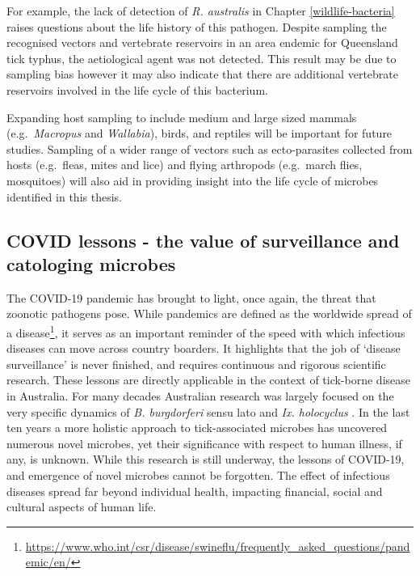 \documentclass[a4paper, nobind]{templates/ociamthesis}
\begin{document}
For example, the lack of detection of \emph{R. australis} in Chapter \ref{wildlife-bacteria} raises questions about the life history of this pathogen.
Despite sampling the recognised vectors and vertebrate reservoirs \autocite{campbellRickettsiosesAustraliaIsolation1974,sextonSpottedFeverGroup1991} in an area endemic for Queensland tick typhus, the aetiological agent was not detected.
This result may be due to sampling bias however it may also indicate that there are additional vertebrate reservoirs involved in the life cycle of this bacterium.

Expanding host sampling to include medium and large sized mammals (e.g.~\emph{Macropus} and \emph{Wallabia}), birds, and reptiles will be important for future studies.
Sampling of a wider range of vectors such as ecto-parasites collected from hosts (e.g.~fleas, mites and lice) and flying arthropods (e.g.~march flies, mosquitoes) will also aid in providing insight into the life cycle of microbes identified in this thesis.

\hypertarget{covid-lessons---the-value-of-surveillance-and-catologing-microbes}{%
\subsection{COVID lessons - the value of surveillance and catologing microbes}\label{covid-lessons---the-value-of-surveillance-and-catologing-microbes}}

The COVID-19 pandemic has brought to light, once again, the threat that zoonotic pathogens pose.
While pandemics are defined as the worldwide spread of a disease\footnote{\url{https://www.who.int/csr/disease/swineflu/frequently_asked_questions/pandemic/en/}}, it serves as an important reminder of the speed with which infectious diseases can move across country boarders.
It highlights that the job of `disease surveillance' is never finished, and requires continuous and rigorous scientific research.
These lessons are directly applicable in the context of tick-borne disease in Australia.
For many decades Australian research was largely focused on the very specific dynamics of \emph{B. burgdorferi} sensu lato and \emph{Ix. holocyclus} \autocite{chaladaThereLymelikeDisease2016}.
In the last ten years a more holistic approach to tick-associated microbes has uncovered numerous novel microbes, yet their significance with respect to human illness, if any, is unknown.
While this research is still underway, the lessons of COVID-19, and emergence of novel microbes cannot be forgotten.
The effect of infectious diseases spread far beyond individual health, impacting financial, social and cultural aspects of human life.
\end{document}

